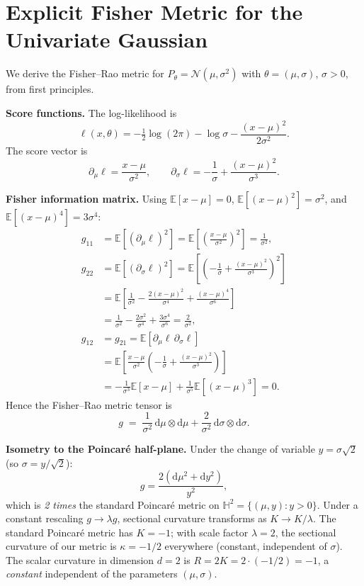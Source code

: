 \documentclass[a4paper,fleqn]{cas-dc}
\newcommand{\E}{\mathbb{E}}
\begin{document}
\section{Explicit Fisher Metric for the Univariate Gaussian}
\label{app:gaussian_fisher}

We derive the Fisher--Rao metric for
$P_\theta = \mathcal{N}(\mu,\sigma^2)$ with
$\theta=(\mu,\sigma)$, $\sigma>0$, from first principles.

\textbf{Score functions.}
The log-likelihood is
\[
  \ell(x,\theta) = -\tfrac12\log(2\pi) - \log\sigma
  - \frac{(x-\mu)^2}{2\sigma^2}.
\]
The score vector is
\[
  \partial_\mu \ell = \frac{x-\mu}{\sigma^2}, \qquad
  \partial_\sigma \ell = -\frac{1}{\sigma} + \frac{(x-\mu)^2}{\sigma^3}.
\]

\textbf{Fisher information matrix.}
Using $\E[x-\mu]=0$, $\E[(x-\mu)^2]=\sigma^2$, and
$\E[(x-\mu)^4]=3\sigma^4$:
\begin{align*}
  g_{11}
  &=
  \E\!\left[(\partial_\mu \ell)^2\right]
  =
  \E\!\left[
    \left(\frac{x-\mu}{\sigma^2}\right)^2
  \right]
  =
  \frac{1}{\sigma^2}, \\[0.4em]
  g_{22}
  &=
  \E\!\left[(\partial_\sigma \ell)^2\right]
  =
  \E\!\left[
    \left(
      -\frac{1}{\sigma}
      +
      \frac{(x-\mu)^2}{\sigma^3}
    \right)^2
  \right] \\
  &=
  \E\!\left[
    \frac{1}{\sigma^2}
    -
    \frac{2(x-\mu)^2}{\sigma^4}
    +
    \frac{(x-\mu)^4}{\sigma^6}
  \right]\\
  &=
  \frac{1}{\sigma^2}
  -
  \frac{2\sigma^2}{\sigma^4}
  +
  \frac{3\sigma^4}{\sigma^6}
  =
  \frac{2}{\sigma^2}, \\[0.4em]
  g_{12}
  &=
  g_{21}
  =
  \E\!\left[
    \partial_\mu \ell\,\partial_\sigma \ell
  \right] \\
  &=
  \E\!\left[
    \frac{x-\mu}{\sigma^2}
    \left(
      -\frac{1}{\sigma}
      +
      \frac{(x-\mu)^2}{\sigma^3}
    \right)
  \right] \\
  &=
  -\frac{1}{\sigma^3}\E[x-\mu]
  +
  \frac{1}{\sigma^5}\E[(x-\mu)^3]
  =
  0.
\end{align*}
Hence the Fisher--Rao metric tensor is
\begin{equation}
  g \;=\; \frac{1}{\sigma^2}\,\mathrm{d}\mu\otimes\mathrm{d}\mu
       + \frac{2}{\sigma^2}\,\mathrm{d}\sigma\otimes\mathrm{d}\sigma.
  \label{eq:gauss_fim_explicit}
\end{equation}

\textbf{Isometry to the Poincar\'e half-plane.}
Under the change of variable $y = \sigma\sqrt{2}$ (so $\sigma = y/\sqrt{2}$):
\[
  g = \frac{2(\mathrm{d}\mu^2 + \mathrm{d}y^2)}{y^2},
\]
which is \emph{2 times} the standard Poincar\'e metric on
$\mathbb{H}^2 = \{(\mu,y):y>0\}$.
Under a constant rescaling $g \to \lambda g$, sectional curvature
transforms as $K \to K/\lambda$.  The standard Poincar\'e metric has
$K=-1$; with scale factor $\lambda=2$, the sectional curvature of our
metric is $\kappa = -1/2$ everywhere (constant, independent of $\sigma$).
The scalar curvature in dimension $d=2$ is $R = 2K = 2\cdot(-1/2) = -1$,
a \emph{constant} independent of the parameters $(\mu, \sigma)$.
\end{document}
